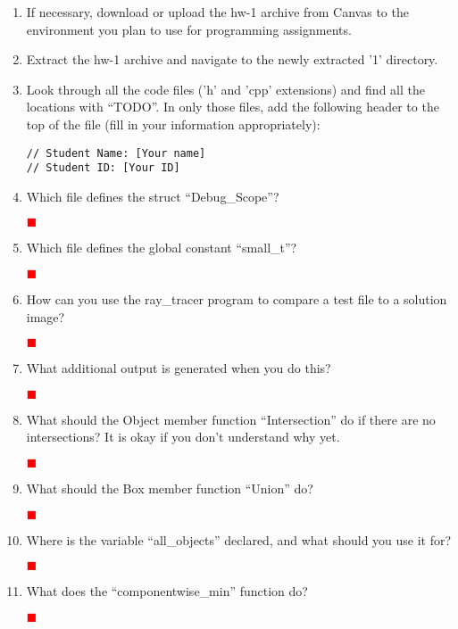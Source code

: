 \documentclass[12pt]{article}
\newenvironment{solution}{\par\textcolor{green!50!black}\bgroup}{\egroup\par}
\newcommand{\TODO}{\textcolor{red}{$\blacksquare$}}
\begin{document}
\begin{enumerate}
\item If necessary, download or upload the hw-1 archive from Canvas to the environment you plan to use for programming assignments.
\item Extract the hw-1 archive and navigate to the newly extracted '1' directory.
\item Look through all the code files ('h' and 'cpp' extensions) and find all the locations with ``TODO''. In only those files, add the following header to the top of the file (fill in your information appropriately):
\begin{verbatim}
// Student Name: [Your name]
// Student ID: [Your ID]
\end{verbatim}
\item Which file defines the struct ``Debug\_Scope''?
  \begin{solution}
  \textbf{\textcolor{red}{\TODO}}
  \end{solution}
\item Which file defines the global constant ``small\_t''?
  \begin{solution}
  \textbf{\textcolor{red}{\TODO}}
  \end{solution}
\item How can you use the ray\_tracer program to compare a test file to a solution image?
  \begin{solution}
  \textbf{\textcolor{red}{\TODO}}
  \end{solution}
\item What additional output is generated when you do this?
  \begin{solution}
  \textbf{\textcolor{red}{\TODO}}
  \end{solution}
\item What should the Object member function  ``Intersection'' do if there are no intersections? It is okay if you don't understand why yet.
  \begin{solution}
  \textbf{\textcolor{red}{\TODO}}
  \end{solution}
\item What should the Box member function  ``Union'' do?
  \begin{solution}
  \textbf{\textcolor{red}{\TODO}}
  \end{solution}
\item Where is the variable ``all\_objects'' declared, and what should you use it for?
  \begin{solution}
  \textbf{\textcolor{red}{\TODO}}
  \end{solution}
\item What does the ``componentwise\_min'' function do?
  \begin{solution}
  \textbf{\textcolor{red}{\TODO}}
  \end{solution}


\end{enumerate}
\end{document}
